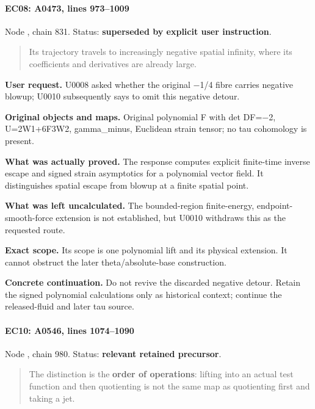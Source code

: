 \paragraph{EC08: A0473, lines 973--1009}\label{ec08-a0473-lines-9731009}

Node \protect{}, chain 831.
Status: \textbf{superseded by explicit user instruction}.

\begin{quote}
Its trajectory travels to increasingly negative spatial infinity, where
its coefficients and derivatives are already large.
\end{quote}

\textbf{User request.} U0008 asked whether the original
\allowbreak{}\ensuremath{−}\allowbreak{}1/4 fibre carries negative
blowup; U0010 subsequently says to omit this negative detour.

\textbf{Original objects and maps.} Original polynomial F with det
DF=\allowbreak{}\ensuremath{−}\allowbreak{}2, U=2W1+6F3W2, gamma\_minus,
Euclidean strain tensor; no tau cohomology is present.

\textbf{What was actually proved.} The response computes explicit
finite-time inverse escape and signed strain asymptotics for a
polynomial vector field. It distinguishes spatial escape from blowup at
a finite spatial point.

\textbf{What was left uncalculated.} The bounded-region finite-energy,
endpoint-smooth-force extension is not established, but U0010 withdraws
this as the requested route.

\textbf{Exact scope.} Its scope is one polynomial lift and its physical
extension. It cannot obstruct the later theta/absolute-base
construction.

\textbf{Concrete continuation.} Do not revive the discarded negative
detour. Retain the signed polynomial calculations only as historical
context; continue the released-fluid and later tau source.

\paragraph{EC10: A0546, lines
1074--1090}\label{ec10-a0546-lines-10741090}

Node \protect{}, chain 980.
Status: \textbf{relevant retained precursor}.

\begin{quote}
The distinction is the \textbf{order of operations}: lifting into an
actual test function and then quotienting is not the same map as
quotienting first and taking a jet.
\end{quote}

